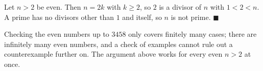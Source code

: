 Let $n>2$ be even. Then $n=2k$ with $k\ge2$, so $2$ is a divisor of $n$ with $1<2<n$. A prime has no divisors other than $1$ and itself, so $n$ is not prime. $\blacksquare$

Checking the even numbers up to $3458$ only covers finitely many cases; there are infinitely many even numbers, and a check of examples cannot rule out a counterexample further on. The argument above works for every even $n>2$ at once.
